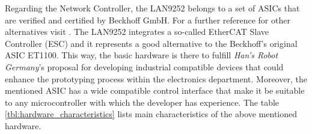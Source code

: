 Regarding the Network Controller, the LAN9252 belongs to a set of ASICs that are verified and certified by Beckhoff GmbH. For a further
reference for other alternatives visit \cite{beckhoff_esccomparison}. The LAN9252 integrates a so-called EtherCAT Slave Controller (ESC) and it represents a good 
alternative to the Beckhoff's original ASIC ET1100. This way, the basic hardware is there to fulfill \emph{Han's Robot Germany}'s
proposal for developing industrial compatible devices that could enhance the prototyping process within the electronics department. 
Moreover, the mentioned ASIC has a wide compatible control interface that make it be suitable to any microcontroller with which 
the developer has experience. The table \ref{tbl:hardware_characteristics} lists main characteristics of the above mentioned hardware.


